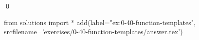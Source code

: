 
\begin{ex}
  \label{ex:0-40-function-templates}
  
  \qed
\end{ex}
\begin{python0}
from solutions import *
add(label="ex:0-40-function-templates",
    srcfilename='exercises/0-40-function-templates/answer.tex')
\end{python0}
